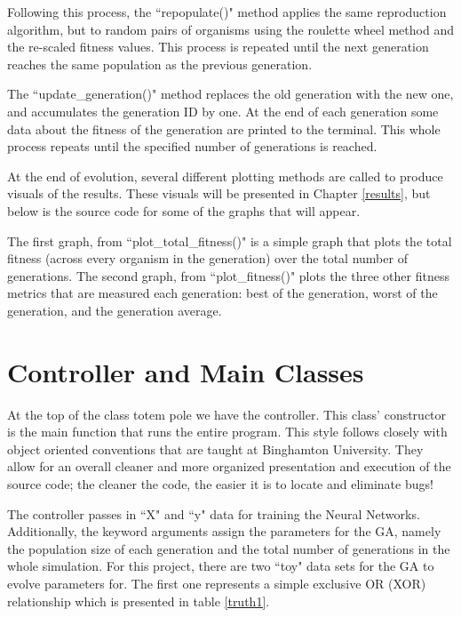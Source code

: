 \documentclass[12pt]{report}
\begin{document}
Following this process, the ``repopulate()" method applies the same reproduction algorithm, but to random pairs of organisms using the roulette wheel method and the re-scaled fitness values. This process is repeated until the next generation reaches the same population as the previous generation.

The ``update\_generation()" method replaces the old generation with the new one, and accumulates the generation ID by one. At the end of each generation some data about the fitness of the generation are printed to the terminal. This whole process repeats until the specified number of generations is reached.

At the end of evolution, several different plotting methods are called to produce visuals of the results.
These visuals will be presented in Chapter \ref{results}, but below is the source code for some of the graphs that will appear.



The first graph, from ``plot\_total\_fitness()" is a simple graph that plots the total fitness (across every organism in the generation) over the total number of generations. The second graph, from ``plot\_fitness()" plots the three other fitness metrics that are measured each generation: best of the generation, worst of the generation, and the generation average.

\section{Controller and Main Classes}
At the top of the class totem pole we have the controller. This class' constructor is the main function that runs the entire program. This style follows closely with object oriented conventions that are taught at Binghamton University.
They allow for an overall cleaner and more organized presentation and execution of the source code; the cleaner the code, the easier it is to locate and eliminate bugs!



The controller passes in ``X" and ``y" data for training the Neural Networks. Additionally, the keyword arguments assign the parameters for the GA, namely the population size of each generation and the total number of generations in the whole simulation. For this project, there are two ``toy" data sets for the GA to evolve parameters for. The first one represents a simple exclusive OR (XOR) relationship which is presented in table \ref{truth1}.
\end{document}
